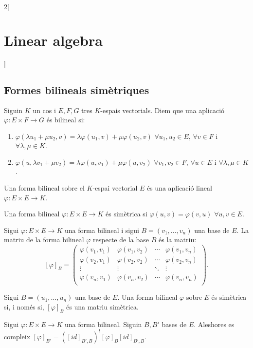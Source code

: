 \documentclass[class=article,10pt,crop=false]{standalone}
\begin{document}
\begin{multicols}{2}[\section{Linear algebra}]
\subsection{Formes bilineals simètriques}
\begin{definition}
Siguin $K$ un cos i $E,F,G$ tres $K$-espais vectorials. Diem que una aplicació $\varphi:E\times F\rightarrow G$ és bilineal si:
\begin{enumerate}
    \item $\varphi(\lambda u_1+\mu u_2,v)=\lambda \varphi(u_1,v)+\mu \varphi(u_2,v)$ $\forall u_1,u_2\in E$, $\forall v\in F$ i $\forall\lambda,\mu\in K$.
    \item $\varphi(u,\lambda v_1+\mu v_2)=\lambda \varphi(u,v_1)+\mu \varphi(u,v_2)$ $\forall v_1,v_2\in F$, $\forall u\in E$ i $\forall\lambda,\mu\in K$.
\end{enumerate}
\end{definition}
\begin{definition}
Una forma bilineal sobre el $K$-espai vectorial $E$ és una aplicació lineal $\varphi:E\times E\rightarrow K$.
\end{definition}
\begin{definition}
Una forma bilineal $\varphi:E\times E\rightarrow K$ és simètrica si $\varphi(u,v)=\varphi(v,u)$ $\forall u,v\in E$.
\end{definition}
\begin{definition}
Sigui $\varphi:E\times E\rightarrow K$ una forma bilineal i sigui $B=(v_1,\ldots,v_n)$ una base de $E$. La matriu de la forma bilineal $\varphi$ respecte de la base $B$ és la matriu: $$[\varphi]_B=\begin{pmatrix}
\varphi(v_1,v_1) & \varphi(v_1,v_2) & \cdots & \varphi(v_1,v_n) \\
\varphi(v_2,v_1) & \varphi(v_2,v_2) & \cdots & \varphi(v_2,v_n) \\
\vdots & \vdots & \ddots & \vdots \\
\varphi(v_n,v_1) & \varphi(v_n,v_2) & \cdots & \varphi(v_n,v_n) \\
\end{pmatrix}.$$ 
\end{definition}
\begin{prop}
Sigui $B=(u_1,\ldots,u_n)$ una base de $E$. Una forma bilineal $\varphi$ sobre $E$ és simètrica si, i només si, $[\varphi]_B$ és una matriu simètrica.
\end{prop}
\begin{prop}
Sigui $\varphi:E\times E\rightarrow K$ una forma bilineal. Siguin $B,B'$ bases de $E$. Aleshores es compleix $[\varphi]_{B'}=([id]_{B',B})^t[\varphi]_B[id]_{B',B}$.

\end{prop}
\end{multicols}
\end{document}
